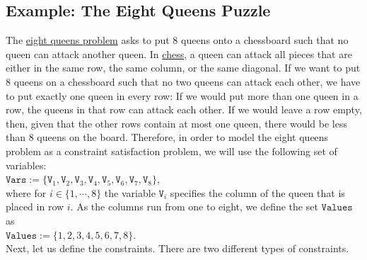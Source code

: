 \subsection{Example: The Eight Queens Puzzle}
The \href{https://en.wikipedia.org/wiki/Eight_queens_puzzle}{eight queens problem} asks to put 8 queens onto a
chessboard such that no queen can attack another queen.  In \href{https://en.wikipedia.org/wiki/Chess}{chess},
a queen can attack all pieces that are either in the same row, the same column, or the same diagonal.  If we
want to put 8 queens on a chessboard such that no two queens can attack each other, we have to put exactly one
queen in every row:  If we would put more than one queen in a row, the queens in that row can attack each other.
If we would leave a row empty, then, given that the other rows contain at most one queen, there would be less
than 8 queens on the board.  Therefore, in order to model the eight queens problem as a constraint satisfaction
problem, we will use the following set of variables:
\\[0.2cm]
\hspace*{1.3cm}
$\texttt{Vars} := \{ \texttt{V}_1, \texttt{V}_2, \texttt{V}_3, \texttt{V}_4, \texttt{V}_5, \texttt{V}_6, \texttt{V}_7,\texttt{V}_8 \}$,
\\[0.2cm]
where for $i \in \{1,\cdots,8\}$ the variable $\texttt{V}_i$ specifies the column of the queen that is placed in
row $i$.   As the columns run from one to eight, we define the set $\texttt{Values}$ as
\\[0.2cm]
\hspace*{1.3cm}
$\texttt{Values} := \{1,2,3,4,5,6,7,8\}$.
\\[0.2cm]
Next, let us define the constraints.  There are two different types of constraints.
